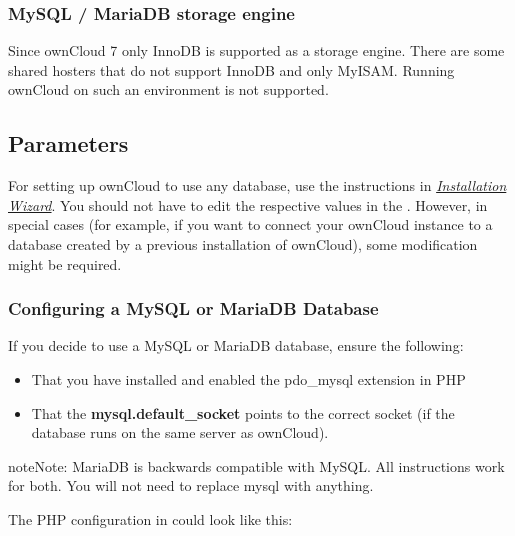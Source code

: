 \documentclass[letterpaper,10pt,english]{sphinxmanual}
\begin{document}
\subsubsection{MySQL / MariaDB storage engine}
\label{configuration_database/linux_database_configuration:db-storage-engine-label}\label{configuration_database/linux_database_configuration:mysql-mariadb-storage-engine}
Since ownCloud 7 only InnoDB is supported as a storage engine. There are some shared hosters that
do not support InnoDB and only MyISAM. Running ownCloud on such an environment is not supported.


\subsection{Parameters}
\label{configuration_database/linux_database_configuration:parameters}
For setting up ownCloud to use any database, use the instructions in {\hyperref[installation/installation_wizard::doc]{\emph{Installation Wizard}}}. You should not have to edit the respective values in the .  However, in special cases (for example, if you want to connect your ownCloud instance to a database created by a previous installation of ownCloud), some modification might be required.


\subsubsection{Configuring a MySQL or MariaDB Database}
\label{configuration_database/linux_database_configuration:configuring-a-mysql-or-mariadb-database}
If you decide to use a MySQL or MariaDB database, ensure the following:
\begin{itemize}
\item {} 
That you have installed and enabled the pdo\_mysql extension in PHP

\item {} 
That the \textbf{mysql.default\_socket} points to the correct socket (if the database runs on the same server as ownCloud).

\end{itemize}

\begin{notice}{note}{Note:}
MariaDB is backwards compatible with MySQL.  All instructions work for both. You will not need to replace mysql with anything.
\end{notice}

The PHP configuration in  could look like this:
\end{document}
